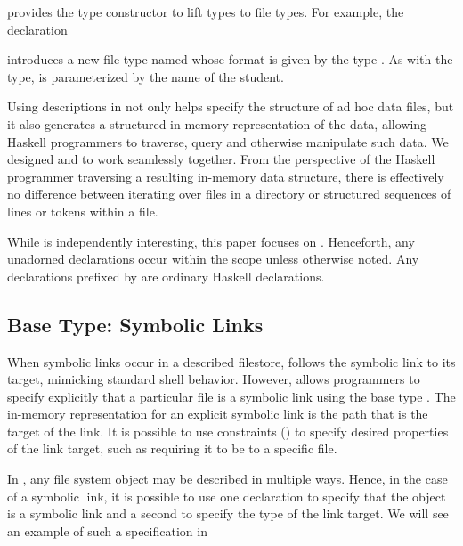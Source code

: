 \forest{} provides the  type constructor to lift \pads{}
types to \forest{} file types.  For example, the declaration
\begin{code}
[forest| \kw{type} SFile(n::String) = File(Student n) |]
\end{code}
introduces a new file type named  whose format is given by
the \pads{} type .  As with the \pads{} type, 
is parameterized by the name of the student.  

Using \padshaskell{} descriptions in \forest{} not only helps specify
the structure of ad hoc data files, but it also generates a structured
in-memory representation of the data, allowing Haskell programmers to
traverse, query and otherwise manipulate such data.  
We designed \padshaskell{} and \forest{} to work seamlessly
together.  From the perspective of the Haskell programmer traversing
a resulting in-memory data structure, there is effectively no difference
between iterating over files in a directory or structured sequences of
lines or tokens within a file.

While \padshaskell{} is independently interesting,
this paper focuses on \forest{}.  Henceforth, any
unadorned declarations occur within the \forest{} scope
\cd{[forest|...|]} unless otherwise noted.  Any declarations prefixed
by \cd{>} 
are ordinary Haskell declarations.

\subsection{Base Type: Symbolic Links}
\label{sec:symlinks}
When symbolic links occur in a described filestore,
\forest{} follows the symbolic link to its target, mimicking 
standard shell behavior.    However, \forest{} allows
programmers to specify explicitly that a particular file is a
symbolic link using the base type .  The in-memory
representation for an explicit symbolic link is the path that is the
target of the link.  It is possible to use constraints
() to specify desired properties of the link
target, such as requiring it to be to a specific file.

In \forest{}, any file system object may be described in multiple ways.
Hence, in the case of a symbolic link, it is possible to use one declaration to
specify that the object is a symbolic link and a second to specify
the type of the link target.  We will see an example of such a specification in 


